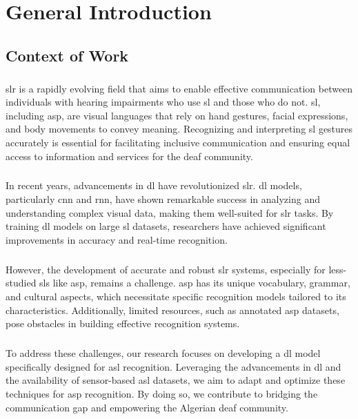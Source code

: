 \chapter*{General Introduction}
\section{Context of Work}
\paragraph{}
\ac{slr} is a rapidly evolving field that aims to enable effective communication between individuals with hearing impairments who use \ac{sl} and those who do not. \ac{sl}, including \ac{asp}, are visual languages that rely on hand gestures, facial expressions, and body movements to convey meaning. Recognizing and interpreting \ac{sl} gestures accurately is essential for facilitating inclusive communication and ensuring equal access to information and services for the deaf community.
\paragraph{}
In recent years, advancements in \ac{dl} have revolutionized \ac{slr}. \ac{dl} models, particularly \ac{cnn} and \ac{rnn}, have shown remarkable success in analyzing and understanding complex visual data, making them well-suited for \ac{slr} tasks. By training \ac{dl} models on large \ac{sl} datasets, researchers have achieved significant improvements in accuracy and real-time recognition.
\paragraph{}
However, the development of accurate and robust \ac{slr} systems, especially for less-studied \ac{sl}s like \ac{asp}, remains a challenge. \ac{asp} has its unique vocabulary, grammar, and cultural aspects, which necessitate specific recognition models tailored to its characteristics. Additionally, limited resources, such as annotated \ac{asp} datasets, pose obstacles in building effective recognition systems.
\paragraph{}
To address these challenges, our research focuses on developing a \ac{dl} model specifically designed for \ac{asl} recognition. Leveraging the advancements in \ac{dl} and the availability of sensor-based \ac{asl} datasets, we aim to adapt and optimize these techniques for \ac{asp} recognition. By doing so, we contribute to bridging the communication gap and empowering the Algerian deaf community.
